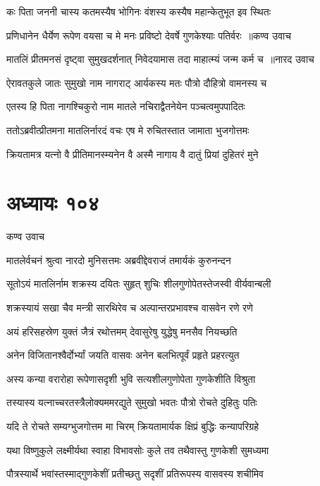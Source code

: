 \twolineshloka
{कः पिता जननी चास्य कतमस्यैष भोगिनः}
{वंशस्य कस्यैष महान्केतुभूत इव स्थितः}


\threelineshloka
{प्रणिधानेन धैर्येण रूपेण वयसा च मे}
{मनः प्रविष्टो देवर्षे गुणकेश्याः पतिर्वरः ॥कण्व उवाच}
{}


\threelineshloka
{मातलिं प्रीतमनसं दृष्ट्वा सुमुखदर्शनात्}
{निवेदयामास तदा माहात्म्यं जन्म कर्म च ॥नारद उवाच}
{}


\twolineshloka
{ऐरावतकुले जातः सुमुखो नाम नागराट्}
{आर्यकस्य मतः पौत्रो दौहित्रो वामनस्य च}


\twolineshloka
{एतस्य हि पिता नागश्चिकुरो नाम मातले}
{नचिराद्वैतनेयेन पञ्चत्वमुपपादितः}


\twolineshloka
{ततोऽब्रवीत्प्रीतमना मातलिर्नारदं वचः}
{एष मे रुचितस्तात जामाता भुजगोत्तमः}


\twolineshloka
{क्रियतामत्र यत्नो वै प्रीतिमानस्म्यनेन वै}
{अस्मै नागाय वै दातुं प्रियां दुहितरं मुने}


\chapter{अध्यायः १०४}
\twolineshloka
{कण्व उवाच}
{}


\twolineshloka
{मातलेर्वचनं श्रुत्वा नारदो मुनिसत्तमः}
{अब्रवीद्देवराजं तमार्यकं कुरुनन्दन}


\twolineshloka
{सूतोऽयं मातलिर्नाम शक्रस्य दयितः सुहृत्}
{शुचिः शीलगुणोपेतस्तेजस्वी वीर्यवान्बली}


\twolineshloka
{शक्रस्यायं सखा चैव मन्त्री सारथिरेव च}
{अल्पान्तरप्रभावश्च वासवेन रणे रणे}


\twolineshloka
{अयं हरिसहस्रेण युक्तं जैत्रं रथोत्तमम्}
{देवासुरेषु युद्धेषु मनसैव नियच्छति}


\twolineshloka
{अनेन विजितानश्वैर्दोर्भ्यां जयति वासवः}
{अनेन बलभित्पूर्वं प्रहृते प्रहरत्युत}


\twolineshloka
{अस्य कन्या वरारोहा रूपेणासदृशी भुवि}
{सत्यशीलगुणोपेता गुणकेशीति विश्रुता}


\twolineshloka
{तस्यास्य यत्नाच्चरतस्त्रैलोक्यममरद्युते}
{सुमुखो भवतः पौत्रो रोचते दुहितुः पतिः}


\twolineshloka
{यदि ते रोचते सम्यग्भुजगोत्तम मा चिरम्}
{क्रियतामार्यक क्षिप्रं बुद्धिः कन्यापरिग्रहे}


\twolineshloka
{यथा विष्णुकुले लक्ष्मीर्यथा स्वाहा विभावसोः}
{कुले तव तथैवास्तु गुणकेशी सुमध्यमा}


\twolineshloka
{पौत्रस्यार्थे भवांस्तस्माद्गुणकेशीं प्रतीच्छतु}
{सदृशीं प्रतिरूपस्य वासवस्य शचीमिव}


